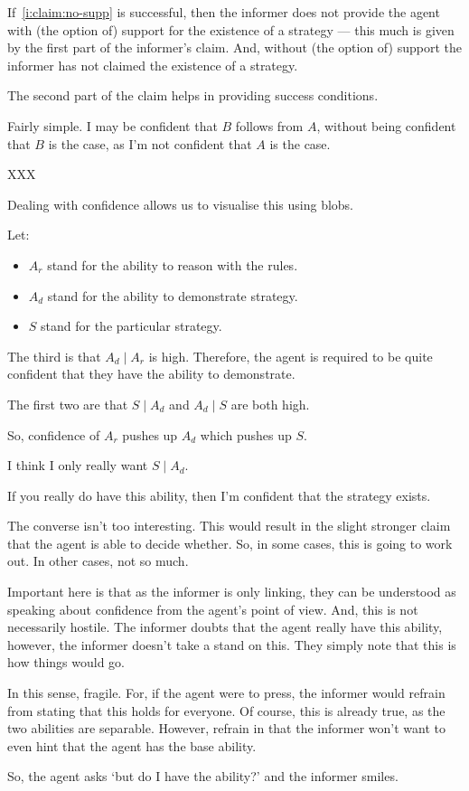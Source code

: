 \documentclass[10pt]{article}
\begin{document}
If~\ref{i:claim:no-supp} is successful, then the informer does not provide the agent with (the option of) support for the existence of a strategy --- this much is given by the first part of the informer's claim.
And, without (the option of) support the informer has not claimed the existence of a strategy.

The second part of the claim helps in providing success conditions.

Fairly simple.
I may be confident that \(B\) follows from \(A\), without being confident that \(B\) is the case, as I'm not confident that \(A\) is the case.

XXX

Dealing with confidence allows us to visualise this using blobs.

Let:
\begin{itemize}
\item \(A_{r}\) stand for the ability to reason with the rules.
\item \(A_{d}\) stand for the ability to demonstrate strategy.
\item \(S\) stand for the particular strategy.
\end{itemize}

The third is that \(A_{d} \mid A_{r}\) is high.
Therefore, the agent is required to be quite confident that they have the ability to demonstrate.

The first two are that \(S \mid A_{d}\) and \(A_{d} \mid S\) are both high.

So, confidence of \(A_{r}\) pushes up \(A_{d}\) which pushes up \(S\).

I think I only really want \(S \mid A_{d}\).

If you really do have this ability, then I'm confident that the strategy exists.

The converse isn't too interesting.
This would result in the slight stronger claim that the agent is able to decide whether.
So, in some cases, this is going to work out.
In other cases, not so much.


{
  \color{red}
  Important here is that as the informer is only linking, they can be understood as speaking about confidence from the agent's point of view.
  And, this is not necessarily hostile.
  The informer doubts that the agent really have this ability, however, the informer doesn't take a stand on this.
  They simply note that this is how things would go.

  In this sense, fragile.
  For, if the agent were to press, the informer would refrain from stating that this holds for everyone.
  Of course, this is already true, as the two abilities are separable.
  However, refrain in that the informer won't want to even hint that the agent has the base ability.

  So, the agent asks `but do I have the ability?' and the informer smiles.
}
\end{document}
